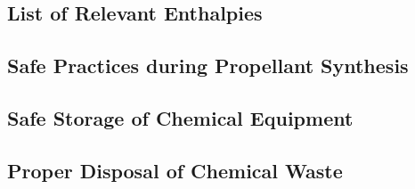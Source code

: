 \documentclass[12pt,letterpaper]{article}
\begin{document}
        \subsection{List of Relevant Enthalpies}
                \lipsum[1-2]
        \subsection{Safe Practices during Propellant Synthesis}
                \lipsum[1-3]
        \subsection{Safe Storage of Chemical Equipment}
                \lipsum[1-2]
    \subsection{Proper Disposal of Chemical Waste}
                \lipsum[1-2]

    \printbibliography
\end{document}
